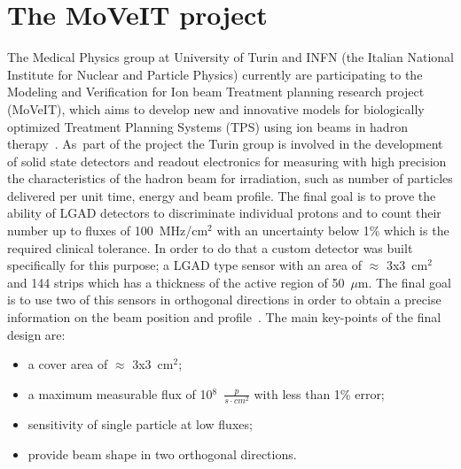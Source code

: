 \section{The MoVeIT project}\label{moveit}
\noindent The Medical Physics group at University of Turin and INFN (the Italian National Institute for Nuclear and Particle Physics) currently are participating to the Modeling and Verification for Ion beam Treatment planning research project (MoVeIT), which aims to develop new and innovative models for biologically optimized Treatment Planning Systems (TPS) using ion beams in hadron therapy~\cite{moveit}.
As~part of the project the Turin group is involved in the development of solid state detectors and readout electronics for measuring with high precision
the characteristics of the hadron beam for irradiation, such as number of particles delivered per unit time, energy and beam profile.
The final goal is to prove the ability of LGAD detectors to discriminate individual protons and to count their number up to fluxes of 100~MHz/cm$^2$ with an uncertainty below 1\% which is the required clinical tolerance.
In order to do that a custom detector was built specifically for this purpose; a LGAD type sensor with an area of $\approx$ 3x3~cm$^2$ and 144 strips which has a thickness of the active region of 50~$\mu$m.
The final goal is to use two of this sensors in orthogonal directions in order to obtain a precise information on the beam position and profile~\cite{hammad}.
The main key-points of the final design are:
\begin{itemize}
	\item a cover area of $\approx$ 3x3~cm$^2$;
	\item a maximum measurable flux of 10$^8$~$\frac{p}{s \cdot cm^2}$ with less than 1\% error;
	\item sensitivity of single particle at low fluxes;
	\item provide beam shape in two orthogonal directions.
\end{itemize}


